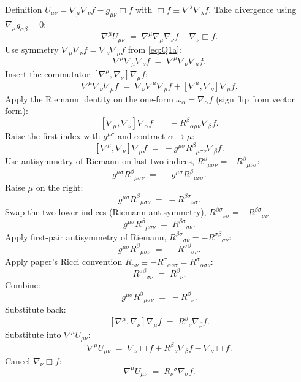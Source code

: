 \documentclass[11pt]{article}
\begin{document}
Definition $U_{\mu\nu}=\nabla_\mu\nabla_\nu f - g_{\mu\nu}\Box f$ with $\Box f\equiv\nabla^\lambda\nabla_\lambda f$. Take divergence using $\nabla_\mu g_{\alpha\beta}=0$:
\[
\nabla^\mu U_{\mu\nu} \;=\; \nabla^\mu\nabla_\mu\nabla_\nu f - \nabla_\nu\Box f.
\]
Use symmetry $\nabla_\mu\nabla_\nu f=\nabla_\nu\nabla_\mu f$ from \eqref{eq:Q1a}:
\[
\nabla^\mu\nabla_\mu\nabla_\nu f \;=\; \nabla^\mu\nabla_\nu\nabla_\mu f.
\]
Insert the commutator $[\nabla^\mu,\nabla_\nu]\nabla_\mu f$:
\[
\nabla^\mu\nabla_\nu\nabla_\mu f \;=\; \nabla_\nu\nabla^\mu\nabla_\mu f + [\nabla^\mu,\nabla_\nu]\nabla_\mu f.
\]
Apply the Riemann identity on the one-form $\omega_\alpha=\nabla_\alpha f$ (sign flip from vector form):
\[
[\nabla_\mu,\nabla_\nu]\nabla_\alpha f \;=\; -R^\beta{}_{\alpha\mu\nu}\nabla_\beta f.
\]
Raise the first index with $g^{\mu\sigma}$ and contract $\alpha\to\mu$:
\[
[\nabla^\mu,\nabla_\nu]\nabla_\mu f \;=\; -g^{\mu\sigma}R^\beta{}_{\mu\sigma\nu}\nabla_\beta f.
\]
Use antisymmetry of Riemann on last two indices, $R^\beta{}_{\mu\sigma\nu}=-R^\beta{}_{\mu\nu\sigma}$:
\[
g^{\mu\sigma}R^\beta{}_{\mu\sigma\nu} \;=\; -g^{\mu\sigma}R^\beta{}_{\mu\nu\sigma}.
\]
Raise $\mu$ on the right:
\[
g^{\mu\sigma}R^\beta{}_{\mu\sigma\nu} \;=\; -R^{\beta\sigma}{}_{\nu\sigma}.
\]
Swap the two lower indices (Riemann antisymmetry), $R^{\beta\sigma}{}_{\nu\sigma}=-R^{\beta\sigma}{}_{\sigma\nu}$:
\[
g^{\mu\sigma}R^\beta{}_{\mu\sigma\nu} \;=\; R^{\beta\sigma}{}_{\sigma\nu}.
\]
Apply first-pair antisymmetry of Riemann, $R^{\beta\sigma}{}_{\sigma\nu}=-R^{\sigma\beta}{}_{\sigma\nu}$:
\[
g^{\mu\sigma}R^\beta{}_{\mu\sigma\nu} \;=\; -R^{\sigma\beta}{}_{\sigma\nu}.
\]
Apply paper's Ricci convention $R_{\alpha\nu}\equiv-R^\sigma{}_{\alpha\nu\sigma}=R^\sigma{}_{\alpha\sigma\nu}$:
\[
R^{\sigma\beta}{}_{\sigma\nu} \;=\; R^\beta{}_\nu.
\]
Combine:
\[
g^{\mu\sigma}R^\beta{}_{\mu\sigma\nu} \;=\; -R^\beta{}_\nu.
\]
Substitute back:
\[
[\nabla^\mu,\nabla_\nu]\nabla_\mu f \;=\; R^\beta{}_\nu\nabla_\beta f.
\]
Substitute into $\nabla^\mu U_{\mu\nu}$:
\[
\nabla^\mu U_{\mu\nu} \;=\; \nabla_\nu\Box f + R^\beta{}_\nu\nabla_\beta f - \nabla_\nu\Box f.
\]
Cancel $\nabla_\nu\Box f$:
\begin{equation}
\boxed{\;\nabla^\mu U_{\mu\nu} \;=\; R_\nu{}^\sigma\nabla_\sigma f.\;}
\label{eq:Q1d1}
\end{equation}
\end{document}
